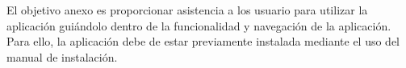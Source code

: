 El objetivo anexo es proporcionar asistencia a los usuario para utilizar la aplicación guiándolo dentro de la funcionalidad y navegación de la aplicación. Para ello, la aplicación debe de estar previamente instalada mediante el uso del manual de instalación.